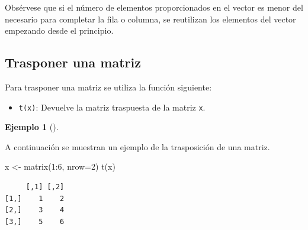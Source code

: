 \documentclass[
  a4paper,
]{scrreport}
\newenvironment{Shaded}{\begin{snugshade}}{\end{snugshade}}
\newcommand{\AttributeTok}[1]{\textcolor[rgb]{0.40,0.45,0.13}{#1}}
\newcommand{\DecValTok}[1]{\textcolor[rgb]{0.68,0.00,0.00}{#1}}
\newcommand{\FunctionTok}[1]{\textcolor[rgb]{0.28,0.35,0.67}{#1}}
\newcommand{\NormalTok}[1]{\textcolor[rgb]{0.00,0.23,0.31}{#1}}
\newcommand{\OtherTok}[1]{\textcolor[rgb]{0.00,0.23,0.31}{#1}}
\newcommand{\SpecialCharTok}[1]{\textcolor[rgb]{0.37,0.37,0.37}{#1}}
\providecommand{\tightlist}{%
  \setlength{\itemsep}{0pt}\setlength{\parskip}{0pt}}\usepackage{longtable,booktabs,array}
\theoremstyle{definition}
\theoremstyle{definition}
\newtheorem{example}{Ejemplo}[chapter]
\theoremstyle{remark}
\begin{document}
\begin{tcolorbox}[enhanced jigsaw, title=\textcolor{quarto-callout-warning-color}{\faExclamationTriangle}\hspace{0.5em}{Advertencia}, titlerule=0mm, toprule=.15mm, colbacktitle=quarto-callout-warning-color!10!white, arc=.35mm, colframe=quarto-callout-warning-color-frame, opacitybacktitle=0.6, coltitle=black, left=2mm, colback=white, opacityback=0, breakable, bottomrule=.15mm, toptitle=1mm, leftrule=.75mm, bottomtitle=1mm, rightrule=.15mm]

Obsérvese que si el número de elementos proporcionados en el vector es
menor del necesario para completar la fila o columna, se reutilizan los
elementos del vector empezando desde el principio.

\end{tcolorbox}

\subsection{Trasponer una matriz}\label{trasponer-una-matriz}

Para trasponer una matriz se utiliza la función siguiente:

\begin{itemize}
\tightlist
\item
  \texttt{t(x)}: Devuelve la matriz traspuesta de la matriz \texttt{x}.
\end{itemize}

\begin{example}[]\protect\hypertarget{exm-trasposicion-matriz}{}\label{exm-trasposicion-matriz}

A continuación se muestran un ejemplo de la trasposición de una matriz.

\begin{Shaded}
\begin{Highlighting}[]
\NormalTok{x }\OtherTok{\textless{}{-}} \FunctionTok{matrix}\NormalTok{(}\DecValTok{1}\SpecialCharTok{:}\DecValTok{6}\NormalTok{, }\AttributeTok{nrow=}\DecValTok{2}\NormalTok{)}
\FunctionTok{t}\NormalTok{(x)}
\end{Highlighting}
\end{Shaded}

\begin{verbatim}
     [,1] [,2]
[1,]    1    2
[2,]    3    4
[3,]    5    6
\end{verbatim}

\end{example}
\end{document}
